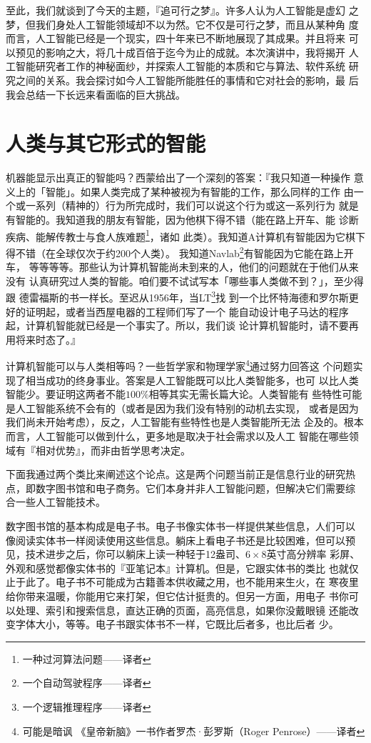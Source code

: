 \documentclass[12pt,a4paper]{article}
\begin{document}
至此，我们就谈到了今天的主题，『追可行之梦』。许多人认为人工智能是虚幻
之梦，但我们身处人工智能领域却不以为然。它不仅是可行之梦，而且从某种角
度而言，人工智能已经是一个现实，四十年来已不断地展现了其成果。并且将来
可以预见的影响之大，将几十成百倍于迄今为止的成就。本次演讲中，我将揭开
人工智能研究者工作的神秘面纱，并探索人工智能的本质和它与算法、软件系统
研究之间的关系。我会探讨如今人工智能所能胜任的事情和它对社会的影响，最
后我会总结一下长远来看面临的巨大挑战。

\section{人类与其它形式的智能}

机器能显示出真正的智能吗？西蒙给出了一个深刻的答案：『我只知道一种操作
意义上的「智能」。如果人类完成了某种被视为有智能的工作，那么同样的工作
由一个或一系列（精神的）行为所完成时，我们可以说这个行为或这一系列行为
就是有智能的。我知道我的朋友有智能，因为他棋下得不错（能在路上开车、能
诊断疾病、能解传教士与食人族难题\footnote{一种过河算法问题——译者}，诸如
此类）。我知道A计算机有智能因为它棋下得不错（在全球仅次于约200个人类）。
我知道Navlab\footnote{一个自动驾驶程序——译者}有智能因为它能在路上开车，
等等等等。那些认为计算机智能尚未到来的人，他们的问题就在于他们从来没有
认真研究过人类的智能。咱们要不试试写本「哪些事人类做不到？」，至少得跟
德雷福斯的书一样长。至迟从1956年，当LT\footnote{一个逻辑推理程序——译者}找
到一个比怀特海德和罗尔斯更好的证明起，或者当西屋电器的工程师们写了一个
能自动设计电子马达的程序起，计算机智能就已经是一个事实了。所以，我们谈
论计算机智能时，请不要再用将来时态了。』

计算机智能可以与人类相等吗？一些哲学家和物理学家\footnote{可能是暗讽
  《皇帝新脑》一书作者罗杰·彭罗斯（Roger Penrose）——译者}通过努力回答这
个问题实现了相当成功的终身事业。答案是人工智能既可以比人类智能多，也可
以比人类智能少。要证明这两者不能$100\%$相等其实无需长篇大论。人类智能有
些特性可能是人工智能系统不会有的（或者是因为我们没有特别的动机去实现，
或者是因为我们尚未开始考虑），反之，人工智能有些特性也是人类智能所无法
企及的。根本而言，人工智能可以做到什么，更多地是取决于社会需求以及人工
智能在哪些领域有『相对优势』，而非由哲学思考决定。

下面我通过两个类比来阐述这个论点。这是两个问题当前正是信息行业的研究热
点，即数字图书馆和电子商务。它们本身并非人工智能问题，但解决它们需要综
合一些人工智能技术。

数字图书馆的基本构成是电子书。电子书像实体书一样提供某些信息，人们可以
像阅读实体书一样阅读使用这些信息。躺床上看电子书还是比较困难，但可以预
见，技术进步之后，你可以躺床上读一种轻于12盎司、$6\times8$英寸高分辨率
彩屏、外观和感觉都像实体书的『亚笔记本』计算机。但是，它跟实体书的类比
也就仅止于此了。电子书不可能成为古籍善本供收藏之用，也不能用来生火，在
寒夜里给你带来温暖，你能用它来打架，但它估计挺贵的。但另一方面，用电子
书你可以处理、索引和搜索信息，直达正确的页面，高亮信息，如果你没戴眼镜
还能改变字体大小，等等。电子书跟实体书不一样，它既比后者多，也比后者
少。
\end{document}
